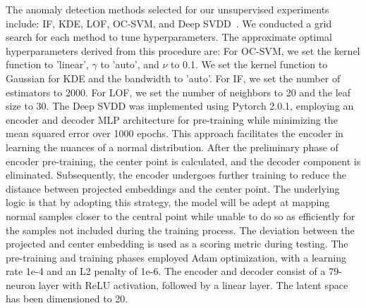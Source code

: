 \documentclass[lettersize,journal]{IEEEtran}
\begin{document}
The anomaly detection methods selected for our unsupervised experiments include: \ac{IF}, \ac{KDE}, \ac{LOF}, \ac{OC-SVM}, and \ac{Deep SVDD}~\cite{ruff2018deep}. We conducted a grid search for each method to tune hyperparameters. The approximate optimal hyperparameters derived from this procedure are: For \ac{OC-SVM}, we set the kernel function to 'linear', $\gamma$ to 'auto', and $\nu$ to 0.1. We set the kernel function to Gaussian for \ac{KDE} and the bandwidth to 'auto'. For \ac{IF}, we set the number of estimators to 2000. For \ac{LOF}, we set the number of neighbors to 20 and the leaf size to 30. The \ac{Deep SVDD} was implemented using Pytorch 2.0.1, employing an encoder and decoder \ac{MLP} architecture for pre-training while minimizing the mean squared error over 1000 epochs. This approach facilitates the encoder in learning the nuances of a normal distribution. After the preliminary phase of encoder pre-training, the center point is calculated, and the decoder component is eliminated. Subsequently, the encoder undergoes further training to reduce the distance between projected embeddings and the center point. The underlying logic is that by adopting this strategy, the model will be adept at mapping normal samples closer to the central point while unable to do so as efficiently for the samples not included during the training process. The deviation between the projected and center embedding is used as a scoring metric during testing. The pre-training and training phases employed Adam optimization, with a learning rate 1e-4 and an L2 penalty of 1e-6. The encoder and decoder consist of a 79-neuron layer with ReLU activation, followed by a linear layer. The latent space has been dimensioned to 20.
\end{document}
